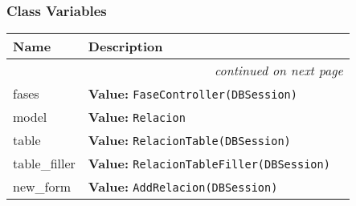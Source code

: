 
  \subsubsection{Class Variables}

    \vspace{-1cm}
\hspace{\varindent}\begin{longtable}{|p{\varnamewidth}|p{\vardescrwidth}|l}
\cline{1-2}
\cline{1-2} \centering \textbf{Name} & \centering \textbf{Description}& \\
\cline{1-2}
\endhead\cline{1-2}\multicolumn{3}{r}{\small\textit{continued on next page}}\\\endfoot\cline{1-2}
\endlastfoot\raggedright f\-a\-s\-e\-s\- & \raggedright \textbf{Value:} 
{\tt FaseController(DBSession)}&\\
\cline{1-2}
\raggedright m\-o\-d\-e\-l\- & \raggedright \textbf{Value:} 
{\tt Relacion}&\\
\cline{1-2}
\raggedright t\-a\-b\-l\-e\- & \raggedright \textbf{Value:} 
{\tt RelacionTable(DBSession)}&\\
\cline{1-2}
\raggedright t\-a\-b\-l\-e\-\_\-f\-i\-l\-l\-e\-r\- & \raggedright \textbf{Value:} 
{\tt RelacionTableFiller(DBSession)}&\\
\cline{1-2}
\raggedright n\-e\-w\-\_\-f\-o\-r\-m\- & \raggedright \textbf{Value:} 
{\tt AddRelacion(DBSession)}&\\
\cline{1-2}
\end{longtable}

